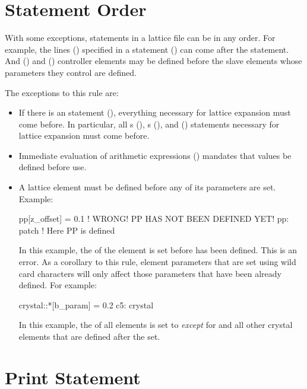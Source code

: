 {{{{{%
\section{Statement Order}
\label{s:state.order}

With some exceptions, statements in a lattice file can be in any order. For example, the lines
() specified in a  statement () can come after the 
statement. And  () and  () controller elements
may be defined before the slave elements whose parameters they control are defined.

The exceptions to this rule are:
\begin{itemize}
\item 
If there is an  statement (), everything necessary for
lattice expansion must come before. In particular, all s
(), s (), and  () statements
necessary for lattice expansion must come before.
\item
Immediate evaluation of arithmetic expressions () mandates that values be defined
before use.
\item
A lattice element must be defined before any of its parameters are set. Example:
\begin{example2}
  pp[z_offset] = 0.1    ! WRONG! PP HAS NOT BEEN DEFINED YET!
  pp: patch             ! Here PP is defined
\end{example2}
In this example, the  of the element  is set before  has been
defined. This is an error. As a corollary to this rule, element parameters that are set 
using wild card characters will only affect those parameters that have been already defined. For
example:
\begin{example2}
  crystal::*[b_param] = 0.2
  c5: crystal
\end{example2}
In this example, the  of all  elements is set to  {\em except} for
 and all other crystal elements that are defined after the set.
\end{itemize}

\section{Print Statement}
\label{s:print}

}}}}}
